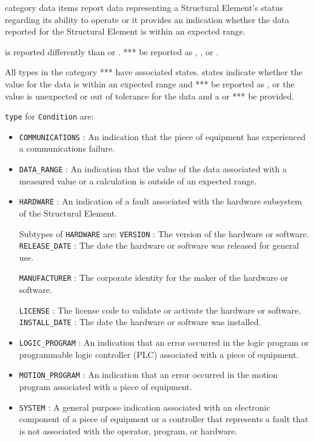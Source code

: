  category data items report data representing a \gls{Structural Element}’s status regarding its ability to operate or it provides an indication whether the data reported for the \gls{Structural Element} is within an expected range.

 is reported differently than  or .   **\must** be reported as , , or .

All  types in the  category **\may** have associated  states.   states indicate whether the value for the data is within an expected range and **\must** be reported as , or the value is unexpected or out of tolerance for the data and a  or  **\must** be provided.


 \texttt{type} for \texttt{Condition} are:
\begin{itemize}

\item \texttt{COMMUNICATIONS} : An indication that the piece of equipment has experienced a communications failure. 

\item \texttt{DATA_RANGE} : An indication that the value of the data associated with a measured value or a calculation is outside of an expected range. 

\item \texttt{HARDWARE} : An indication of a fault associated with the hardware subsystem of the \gls{Structural Element}. 

Subtypes of \texttt{HARDWARE} are: 
\newline\tab \texttt{VERSION} : The version of the hardware or software. 
\newline\tab \texttt{RELEASE_DATE} : The date the hardware or software was released for general use.
 
\newline\tab \texttt{MANUFACTURER} : The corporate identity for the maker of the hardware or software.
 
\newline\tab \texttt{LICENSE} : The license code to validate or activate the hardware or software. 
\newline\tab \texttt{INSTALL_DATE} : The date the hardware or software was installed. 
\item \texttt{LOGIC_PROGRAM} : An indication that an error occurred in the logic program or programmable logic controller (PLC) associated with a piece of equipment. 

\item \texttt{MOTION_PROGRAM} : An indication that an error occurred in the motion program associated with a piece of equipment. 

\item \texttt{SYSTEM} : A general purpose indication associated with an electronic component of a piece of equipment or a controller that represents a fault that is not associated with the operator, program, or hardware. 

\end{itemize}

